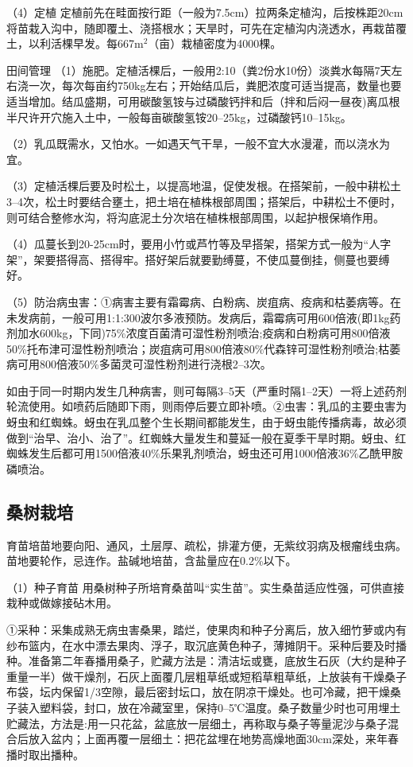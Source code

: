 \documentclass{ctexbook}
\begin{document}
（4）定植 定植前先在畦面按行距（一般为7.5cm）拉两条定植沟，后按株距20cm将苗栽入沟中，随即覆土、浇搭根水；天旱时，可先在定植沟内浇透水，再栽苗覆土，以利活棵早发。每667m$^2$（亩）栽植密度为4000棵。

田间管理
（1）施肥。定植活棵后，一般用2:10（粪2份水10份）淡粪水每隔7天左右浇一次，每次每亩约750kg左右；开始结瓜后，粪肥浓度可适当提高，数量也要适当增加。结瓜盛期，可用碳酸氢铵与过磷酸钙拌和后（拌和后闷一昼夜)离瓜根半尺许开穴施入土中，一般每亩碳酸氢铵20--25kg，过磷酸钙10--15kg。

（2）乳瓜既需水，又怕水。一如遇天气干旱，一般不宜大水漫灌，而以浇水为宜。

（3）定植活棵后要及时松土，以提高地温，促使发根。在搭架前，一般中耕松土3--4次，松土时要结合壅土，把土培在植株根部周围；搭架后，中耕松土不便时，则可结合整修水沟，将沟底泥土分次培在植株根部周围，以起护根保墒作用。

（4）瓜蔓长到20-25cm时，要用小竹或芦竹等及早搭架，搭架方式一般为“人字架”，架要搭得高、搭得牢。搭好架后就要勤缚蔓，不使瓜蔓倒挂，侧蔓也要缚好。

（5）防治病虫害：①病害主要有霜霉病、白粉病、炭疽病、疫病和枯萎病等。在未发病前，一般可用1:1:300波尔多液预防。发病后，霜霉病可用600倍液(即1kg药剂加水600kg，下同)75\%浓度百菌清可湿性粉剂喷治;疫病和白粉病可用800倍液50\%托布津可湿性粉剂喷治；炭疽病可用800倍液80\%代森锌可湿性粉剂喷治;枯萎病可用800倍液50\%多菌灵可湿性粉剂进行浇根2--3次。

如由于同一时期内发生几种病害，则可每隔3--5天（严重时隔1--2天）一将上述药剂轮流使用。如喷药后随即下雨，则雨停后要立即补喷。②虫害：乳瓜的主要虫害为蚜虫和红蜘蛛。蚜虫在乳瓜整个生长期间都能发生，由于蚜虫能传播病毒，故必须做到“治早、治小、治了”。红蜘蛛大量发生和蔓延一般在夏季干旱时期。蚜虫、红蜘蛛发生后都可用1500倍液40\%乐果乳剂喷治，蚜虫还可用1000倍液36\%乙酰甲胺磷喷治。
\subsection{桑树栽培}
育苗培苗地要向阳、通风，土层厚、疏松，排灌方便，无紫纹羽病及根瘤线虫病。苗地要轮作，忌连作。盐碱地培苗，含盐量应在0.2\%以下。

（1）种子育苗 用桑树种子所培育桑苗叫“实生苗”。实生桑苗适应性强，可供直接栽种或做嫁接砧木用。

①采种：采集成熟无病虫害桑果，踏烂，使果肉和种子分离后，放入细竹萝或内有纱布篮内，在水中漂去果肉、浮子，取沉底黄色种子，薄摊阴干。采种后要及时播种。准备第二年春播用桑子，贮藏方法是：清洁坛或甕，底放生石灰（大约是种子重量一半）做干燥剂，石灰上面覆几层粗草纸或短稻草粗草纸，上放装有干燥桑子布袋，坛内保留1/3空隙，最后密封坛口，放在阴凉干燥处。也可冷藏，把干燥桑子装入塑料袋，封口，放在冷藏室里，保持0--5℃温度。桑子数量少时也可用埋土贮藏法，方法是:用一只花盆，盆底放一层细土，再称取与桑子等量泥沙与桑子混合后放入盆内；上面再覆一层细土：把花盆埋在地势高燥地面30cm深处，来年春播时取出播种。
\end{document}
